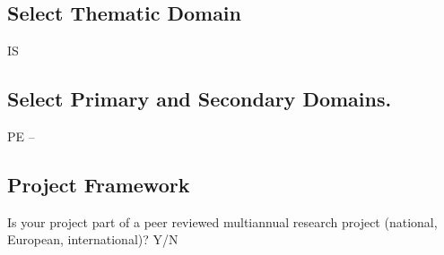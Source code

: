 \subsection{Select Thematic Domain }


IS

\subsection{Select Primary and Secondary Domains.}


PE -- 


\subsection{Project Framework}

Is your project part of a peer reviewed multiannual research project (national,
European, international)? Y/N









% 
